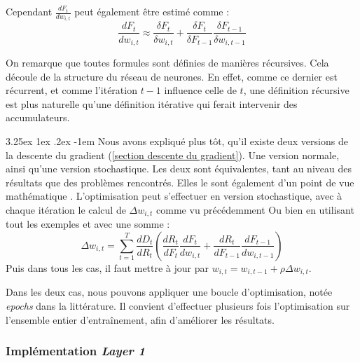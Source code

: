 \documentclass[a4paper, 11pt]{article}
\makeatletter
\renewcommand\paragraph{\@startsection{paragraph}{5}{\z@}%
  {3.25ex \@plus1ex \@minus.2ex}%
  {-1em}%
  {\normalfont\normalsize\bfseries}}
\makeatother
\begin{document}
Cependant $\frac{dF_t}{dw_{i,t}}$ peut également être estimé comme :
$$\frac{dF_t}{dw_{i,t}} \approx \frac{\delta F_t}{\delta w_{i,t}} + \frac{\delta F_t}{\delta F_{t-1}} \frac{\delta F_{t-1}}{\delta w_{i,t-1}}$$

On remarque que toutes formules sont définies de manières récursives. Cela découle de la structure du réseau de neurones. En effet, comme ce dernier est
récurrent, et comme l'itération $t-1$ influence celle de $t$, une définition récursive est plus naturelle qu'une définition itérative qui ferait intervenir
des accumulateurs.

\paragraph{}
Nous avons expliqué plus tôt, qu'il existe deux versions de la descente du gradient (\ref{section descente du gradient}). Une version normale, ainsi qu'une
version stochastique.
Les deux sont équivalentes, tant au niveau des résultats que des problèmes rencontrés. Elles le sont également d'un point de vue mathématique
\cite{learning_to_trade}.
L'optimisation peut s'effectuer en version stochastique, avec à chaque itération le calcul de $\Delta w_{i,t}$ comme vu précédemment
Ou bien en utilisant tout les exemples et avec une somme :
$$\Delta w_{i,t} = \sum_{t=1}^T \frac{dD_t}{dR_t} (\frac{dR_t}{dF_t} \frac{dF_t}{dw_{i,t}} + \frac{dR_t}{dF_{t-1}} \frac{dF_{t-1}}{dw_{i,t-1}})$$
Puis dans tous les cas, il faut mettre à jour par $w_{i,t} = w_{i,t-1} + \rho \Delta w_{i,t}$.

Dans les deux cas, nous pouvons appliquer une boucle d'optimisation, notée \textit{epochs} dans la littérature. Il convient d'effectuer plusieurs fois
l'optimisation sur l'ensemble entier d'entraînement, afin d'améliorer les résultats.

\subsubsection{Implémentation \textit{Layer 1}}
\end{document}
